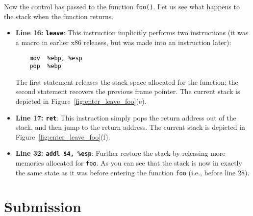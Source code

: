 Now the control has passed to the function {\tt foo()}. Let us see what happens
to the stack when the function returns.

\begin{itemize}
\item \textbf{Line 16: \texttt{leave}}: This
instruction implicitly performs two instructions (it was a macro
in earlier x86 releases, but was made into an instruction later):
\begin{verbatim}
    mov  %ebp, %esp
    pop  %ebp
\end{verbatim}
The first statement releases the stack space allocated for the function; 
the second statement recovers the previous frame pointer. 
The current stack is depicted in Figure~\ref{fig:enter_leave_foo}(e). 

\item \textbf{Line 17: \texttt{ret}}: This instruction simply pops the return 
address out of the stack, and then jump to the return address.
The current stack is depicted in Figure~\ref{fig:enter_leave_foo}(f).

\item \textbf{Line 32: \texttt{addl \$4, \%esp}}: Further restore the stack by
releasing more memories allocated for {\tt foo}. 
As you can see that the stack is now in exactly the same state as it was
before entering the function {\tt foo} (i.e., before line 28). 
\end{itemize}



\section{Submission}






